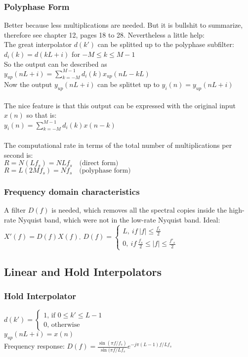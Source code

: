 \subsubsection{Polyphase Form}
Better because less multiplications are needed. But it is bullshit to summarize, therefore see chapter 12, pages 18 to 28.
Nevertheless a little help:\\
The great interpolator $d(k')$ can be splitted up to the polyphase subfilter: $d_i(k) = d(kL+i)$ for $-M\leq k \leq M-1$\\
So the output can be described as $y_{up}(nL+i)=\sum\limits_{k=-M}^{M-1} d_i(k) x_{up}(nL-kL)$\\
Now the output $y_{up}(nL+i)$ can be splittet up to $y_i(n)=y_{up}(nL+i)$\\\\
The nice feature is that this output can be expressed with the original input $x(n)$ so that is:\\ $y_i(n)=\sum\limits_{k=-M}^{M-1} d_i(k) x(n-k)$\\\\
The computational rate in terms of the total number of multiplications per second is:\\
 $R=N (L f_s)=N L f_s \quad \text{(direct form)}$\\
 $R=L (2M f_s)=N f_s \quad \text{(polyphase form)}$\\
\subsubsection{Frequency domain characteristics}
A filter $D(f)$ is needed, which removes all the spectral copies inside the high-rate Nyquist band, which were not in the low-rate Nyquist band. Ideal: $X'(f) = D(f)X(f)$.
$D(f)=\begin{cases} L,\ if\ |f|\leq\frac{f_s}{2}\\
0,\ if\ \frac{f_s}{2}\leq |f|\leq\frac{f'_s}{2}
\end{cases}$

\subsection{Linear and Hold Interpolators}
\subsubsection{Hold Interpolator}
$d(k')=\begin{cases}
1\text{, if }0\leq k' \leq L -1\\
0\text{, otherwise}\end{cases}$\\
$y_{up}(nL+i)=x(n)$\\
Frequency response: $D(f)=\frac{\sin(\pi f/f_s)}{\sin(\pi f/Lf_s}e^{-j\pi(L-1)f/Lf_s}$
